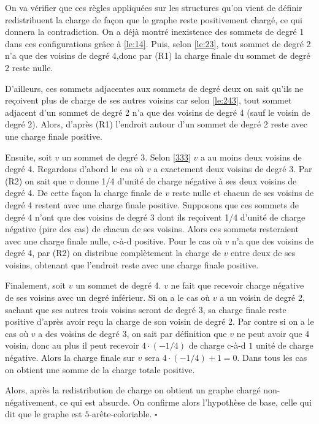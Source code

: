 \documentclass[10pt,a4paper]{article}
\newcommand{\ep}{{\hfill $\square$}}
\begin{document}
On va vérifier que ces règles appliquées sur les structures qu'on vient de définir redistribuent la charge de façon que le graphe reste positivement chargé, ce qui donnera la contradiction. On a déjà montré inexistence des sommets de degré 1 dans ces configurations grâce à \ref{le:14}. Puis, selon \ref{le:23}, tout sommet de degré 2 n'a que des voisins de degré 4,donc par (R1) la charge finale du sommet de degré 2 reste nulle.

D'ailleurs, ces sommets adjacentes aux sommets de degré deux on sait qu'ils ne reçoivent plus de charge de ses autres voisins car selon \ref{le:243}, tout sommet adjacent d'un sommet de degré 2 n'a que des voisins de degré 4 (sauf le voisin de degré 2). Alors, d'après (R1) l'endroit autour d'un sommet de degré 2 reste avec une charge finale positive.

Ensuite, soit $v$ un sommet de degré 3. Selon \ref{333} $v$ a au moins deux voisins de degré 4. Regardons d'abord le cas où $v$ a exactement deux voisins de degré 3. Par (R2) on sait que $v$ donne 1/4 d'unité de charge négative à ses deux voisins de degré 4. De cette façon la charge finale de $v$ reste nulle et chacun de ses voisins de degré 4 restent avec une charge finale positive. Supposons que ces sommets de degré 4 n'ont que des voisins de degré 3 dont ils reçoivent 1/4 d'unité de charge négative (pire des cas) de chacun de ses voisins. Alors ces sommets resteraient avec une charge finale nulle, c-à-d positive. Pour le cas où $v$ n'a que des voisins de degré 4, par (R2) on distribue complètement la charge de $v$ entre deux de ses voisins, obtenant que l'endroit reste avec une charge finale positive.

Finalement, soit $v$ un sommet de degré 4. $v$ ne fait que recevoir charge négative de ses voisins avec un degré inférieur. Si on a le cas où $v$ a un voisin de degré 2, sachant que ses autres trois voisins seront de degré 3, sa charge finale reste positive d'après avoir reçu la charge de son voisin de degré 2. Par contre si on a le cas où $v$ a des voisins de degré 3, on sait par définition que $v$ ne peut avoir que 4 voisin, donc au plus il peut recevoir $4 \cdot (-1/4)$ de charge c-à-d $1$ unité de charge négative. Alors la charge finale sur $v$ sera $4\cdot(-1/4) + 1 = 0$. Dans tous les cas on obtient une somme de la charge totale positive.

Alors, après la redistribution de charge on obtient un graphe chargé non-négativement, ce qui est absurde. On confirme alors l'hypothèse de base, celle qui dit que le graphe est $5$-arête-coloriable.
\ep 
\end{document}
